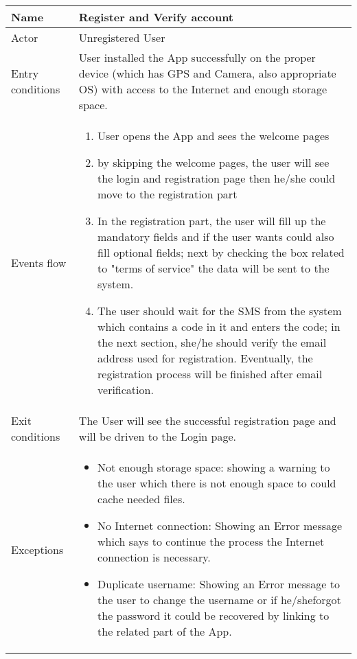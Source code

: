 \begin{table}[!hbtp]
\footnotesize
\centering
\settowidth{}
\setlength\extrarowheight{2pt}
\begin{tabulary}{\textwidth}{|J|J|}
\hline
Name             & Register and Verify account \\
\hline 
Actor            & Unregistered User \\
\hline 
Entry conditions & User installed the App successfully on the proper device (which has GPS and Camera, also appropriate OS) with access to the Internet and enough storage space.\\
\hline 
Events flow      & 
\begin{minipage}[t]{0.7\textwidth}
\begin{enumerate} 
\item User opens the App and sees the welcome pages 
\item by skipping the welcome pages, the user will see the login and registration page then he/she could move to the registration part
\item In the registration part, the user will fill up the mandatory fields and if the user wants could also   fill optional fields; next by checking the box related to "terms of service" the data will be sent to the system.
\item The user should wait for the SMS from the system which contains a code in it and enters the code; in the next section, she/he should verify the email address used for registration. Eventually, the registration process will be finished after email verification.
\end{enumerate}
\end{minipage}\\
\hline
Exit conditions  & The User will see the successful registration page and will be driven to the Login page.\\
\hline
Exceptions       & 
\begin{minipage}[t]{0.8\textwidth}
\begin{itemize} 
\item Not enough storage space: showing a warning to the user which there is not enough space to could cache  needed files.
\item No Internet connection: Showing an Error message which says to continue the process the Internet   connection is necessary.
\item Duplicate username: Showing an Error message to the user to change the username or if he/sheforgot the password it could be recovered by linking to the related part of the App.

\end{itemize}
\end{minipage}
\end{tabulary}
\end{table}
